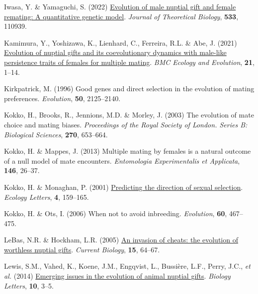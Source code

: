 \documentclass[
]{article}
\newlength{\cslhangindent}
\newlength{\cslentryspacingunit} %
\newenvironment{CSLReferences}[2] %
 {%
  \setlength{\parindent}{0pt}
  \ifodd #1
  \let\oldpar\par
  \def\par{\hangindent=\cslhangindent\oldpar}
  \fi
  \setlength{\parskip}{#2\cslentryspacingunit}
 }%
 {}
\begin{document}
\begin{CSLReferences}{0}{0}
\leavevmode{}%
Iwasa, Y. \& Yamaguchi, S. (2022)
\href{https://doi.org/10.1016/j.jtbi.2021.110939}{{Evolution of male
nuptial gift and female remating: A quantitative genetic model}}.
\emph{Journal of Theoretical Biology}, \textbf{533}, 110939.

\leavevmode{}%
Kamimura, Y., Yoshizawa, K., Lienhard, C., Ferreira, R.L. \& Abe, J.
(2021) \href{https://doi.org/10.1186/s12862-021-01901-x}{{Evolution of
nuptial gifts and its coevolutionary dynamics with male-like persistence
traits of females for multiple mating}}. \emph{BMC Ecology and
Evolution}, \textbf{21}, 1--14.

\leavevmode{}%
Kirkpatrick, M. (1996) Good genes and direct selection in the evolution
of mating preferences. \emph{Evolution}, \textbf{50}, 2125--2140.

\leavevmode{}%
Kokko, H., Brooks, R., Jennions, M.D. \& Morley, J. (2003) The evolution
of mate choice and mating biases. \emph{Proceedings of the Royal Society
of London. Series B: Biological Sciences}, \textbf{270}, 653--664.

\leavevmode{}%
Kokko, H. \& Mappes, J. (2013) Multiple mating by females is a natural
outcome of a null model of mate encounters. \emph{Entomologia
Experimentalis et Applicata}, \textbf{146}, 26--37.

\leavevmode{}%
Kokko, H. \& Monaghan, P. (2001)
\href{https://doi.org/10.1046/j.1461-0248.2001.00212.x}{{Predicting the
direction of sexual selection}}. \emph{Ecology Letters}, \textbf{4},
159--165.

\leavevmode{}%
Kokko, H. \& Ots, I. (2006) {When not to avoid inbreeding}.
\emph{Evolution}, \textbf{60}, 467--475.

\leavevmode{}%
LeBas, N.R. \& Hockham, L.R. (2005) \href{https://doi.org/10.1016/j}{{An
invasion of cheats: the evolution of worthless nuptial gifts}}.
\emph{Current Biology}, \textbf{15}, 64--67.

\leavevmode{}%
Lewis, S.M., Vahed, K., Koene, J.M., Engqvist, L., Bussière, L.F.,
Perry, J.C., \emph{et al.} (2014)
\href{https://doi.org/10.1098/rsbl.2014.0336}{{Emerging issues in the
evolution of animal nuptial gifts}}. \emph{Biology Letters},
\textbf{10}, 3--5.


\end{CSLReferences}
\end{document}
